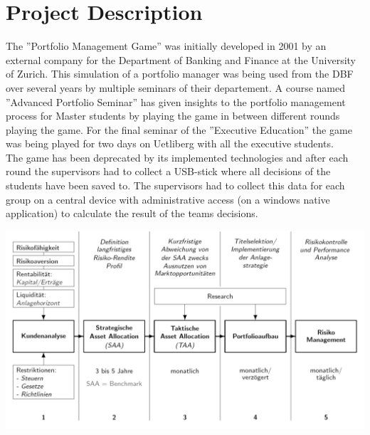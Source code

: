 \section{Project Description}
The ''Portfolio Management Game'' was initially developed in 2001 by an external company for the Department of Banking and Finance at the University of Zurich. This simulation of a portfolio manager was being used from the DBF over several years by multiple seminars of their departement. A course named ''Advanced Portfolio Seminar'' has given insights to the portfolio management process for Master students by playing the game in between different rounds playing the game. For the final seminar of the ''Executive Education'' the game was being played for two days on Uetliberg with all the executive students.\\

The game has been deprecated by its implemented technologies and after each round the supervisors had to collect a USB-stick where all decisions of the students have been saved to. The supervisors had to collect this data for each group on a central device with administrative access (on a windows native application) to calculate the result of the teams decisions.

\begin{center}
  \includegraphics[scale=0.5]{img/private_banking_process.png}
\end{center}
